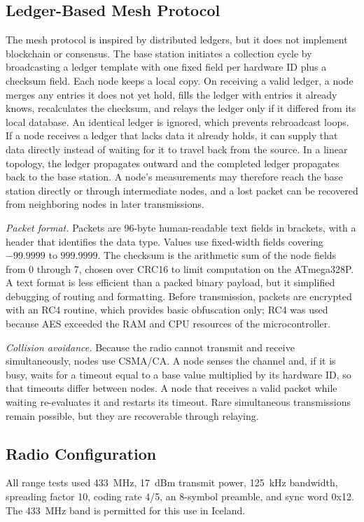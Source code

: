 \documentclass[conference]{IEEEtran}
\begin{document}
\subsection{Ledger-Based Mesh Protocol}
The mesh protocol is inspired by distributed ledgers, but it does not implement blockchain or consensus. The base station initiates a collection cycle by broadcasting a ledger template with one fixed field per hardware ID plus a checksum field. Each node keeps a local copy. On receiving a valid ledger, a node merges any entries it does not yet hold, fills the ledger with entries it already knows, recalculates the checksum, and relays the ledger only if it differed from its local database. An identical ledger is ignored, which prevents rebroadcast loops. If a node receives a ledger that lacks data it already holds, it can supply that data directly instead of waiting for it to travel back from the source. In a linear topology, the ledger propagates outward and the completed ledger propagates back to the base station. A node's measurements may therefore reach the base station directly or through intermediate nodes, and a lost packet can be recovered from neighboring nodes in later transmissions.

\textit{Packet format.} Packets are 96-byte human-readable text fields in brackets, with a header that identifies the data type. Values use fixed-width fields covering $-99.9999$ to $999.9999$. The checksum is the arithmetic sum of the node fields from 0 through 7, chosen over CRC16 to limit computation on the ATmega328P. A text format is less efficient than a packed binary payload, but it simplified debugging of routing and formatting. Before transmission, packets are encrypted with an RC4 routine, which provides basic obfuscation only; RC4 was used because AES exceeded the RAM and CPU resources of the microcontroller.

\textit{Collision avoidance.} Because the radio cannot transmit and receive simultaneously, nodes use CSMA/CA. A node senses the channel and, if it is busy, waits for a timeout equal to a base value multiplied by its hardware ID, so that timeouts differ between nodes. A node that receives a valid packet while waiting re-evaluates it and restarts its timeout. Rare simultaneous transmissions remain possible, but they are recoverable through relaying.

\subsection{Radio Configuration}
All range tests used 433~MHz, 17~dBm transmit power, 125~kHz bandwidth, spreading factor 10, coding rate 4/5, an 8-symbol preamble, and sync word 0x12. The 433~MHz band is permitted for this use in Iceland.
\end{document}
